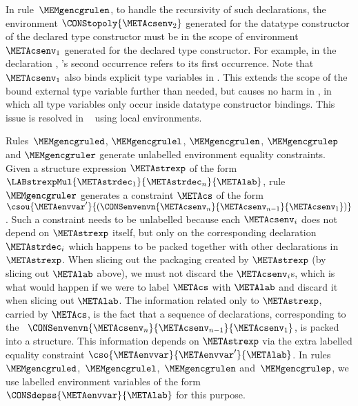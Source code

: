 \documentclass{jfp1}
\begin{document}
%
In rule~$\MEMgencgrulen$, to handle the recursivity of such
declarations, the environment $\CONStopoly{\METAcsenv_2}$ generated
for the datatype constructor of the declared type constructor must be
in the scope of environment $\METAcsenv_1$ generated for the
declared type constructor.  For example, in the declaration
, 's
second occurrence refers to its first occurrence.  Note that
$\METAcsenv_1$ also binds explicit type variables in \CORETES.  This
extends the scope of the bound external type variable further than
needed, but causes no harm in \CORETES, in which all type variables
only occur inside datatype constructor bindings.  This issue is
resolved in \FORMTES~\cite{Rahli:2011} using local environments.


%
Rules~$\MEMgencgruled$, $\MEMgencgrulel$, $\MEMgencgrulen$,
$\MEMgencgrulep$ and $\MEMgencgruler$ generate unlabelled environment
equality constraints.
%
Given a structure expression $\METAstrexp$ of the form
$\LABstrexpMul{\METAstrdec_1}{\METAstrdec_n}{\METAlab}$,
rule~$\MEMgencgruler$ generates a constraint $\METAcs$ of the form
$\csou{\METAenvvar'}{(\CONSenvenvn{\METAcsenv_n}{\METAcsenv_{n-1}}{\METAcsenv_1})}$.
%
Such a constraint needs to be unlabelled because each $\METAcsenv_i$
does not depend on $\METAstrexp$ itself, but only on the corresponding
declaration $\METAstrdec_i$ which happens to be packed together with
other declarations in $\METAstrexp$.
%
When slicing out the packaging created by $\METAstrexp$ (by slicing
out $\METAlab$ above), we must not discard the $\METAcsenv_i$s, which
is what would happen if we were to label $\METAcs$ with $\METAlab$ and
discard it when slicing out $\METAlab$.
%
The information related only to $\METAstrexp$, carried by $\METAcs$,
is the fact that a sequence of declarations, corresponding to the
\COMPENV\ $\CONSenvenvn{\METAcsenv_n}{\METAcsenv_{n-1}}{\METAcsenv_1}$,
is packed into a structure.
%
This information depends on $\METAstrexp$ via the extra labelled
equality constraint $\cso{\METAenvvar}{\METAenvvar'}{\METAlab}$.  In
rules~$\MEMgencgruled$,~$\MEMgencgrulel$,~$\MEMgencgrulen$
and~$\MEMgencgrulep$, we use labelled environment variables of the
form $\CONSdepss{\METAenvvar}{\METAlab}$ for this purpose.
\end{document}
